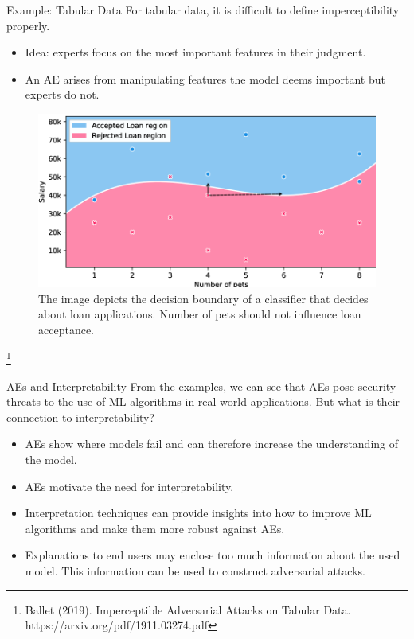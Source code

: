 \documentclass[11pt,compress,t,notes=noshow, aspectratio=169, xcolor=table]{beamer}
\begin{document}
\begin{vbframe}{Example: Tabular Data}
For tabular data, it is difficult to define imperceptibility properly.%
\begin{itemize}
    \item Idea: experts focus on the most important features in their judgment.
    \item An AE arises from manipulating features the model deems important but experts do not.
\end{itemize}
\begin{figure}[h]
\centering
\includegraphics[width=0.6\linewidth]{figure/AEloanApplication.png}
  \caption{The image depicts the decision boundary of a classifier that decides about loan applications. Number of pets should not influence loan acceptance.}
  \label{fig:mnist}
\end{figure} 
\vspace{-0.75cm}
\footnote[frame]{Ballet (2019). Imperceptible Adversarial Attacks on Tabular Data. https://arxiv.org/pdf/1911.03274.pdf}

\end{vbframe}

\begin{vbframe}{AEs and Interpretability}
From the examples, we can see that AEs pose security threats to the use of ML algorithms in real world applications. But what is their connection to interpretability?

\begin{itemize}
    \item AEs show where models fail and can therefore increase the understanding of the model.
    \item AEs motivate the need for interpretability.
    \item Interpretation techniques can provide insights into how to improve ML algorithms and make them more robust against AEs.
    \item Explanations to end users may enclose too much information about the used model. This information can be used to construct adversarial attacks.
\end{itemize}
\end{vbframe}
\end{document}
